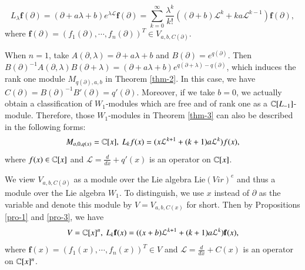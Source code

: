 \documentclass[12pt]{amsart}
\begin{document}
\begin{equation}\label{V(x)}
L_\lambda\mathbf{f}(\partial)
=(\partial+a\lambda+b)e^{\lambda\mathcal{L}}\mathbf{f}(\partial)
=\sum_{k=0}^\infty\frac{\lambda^k}{k!} ((\partial+b)\mathcal{L}^k+ka\mathcal{L}^{k-1})\mathbf{f}(\partial),
\end{equation}
where $\mathbf{f}(\partial)=
(f_1(\partial),\cdots,f_n(\partial))^T\in V_{a,b,C(\partial)}$.

\begin{rmk}When $n=1$, take $A(\partial,\lambda)=\partial+a\lambda+b$ and $B(\partial)=e^{q(\partial)}$. Then $B(\partial)^{-1}A(\partial,\lambda)B(\partial+\lambda)
=(\partial+a\lambda+b)e^{q(\partial+\lambda)-q(\partial)}$, which induces the rank one module $M_{q(\partial), a,b}$ in Theorem \ref{thm-2}. In this case, we have $C(\partial)=B(\partial)^{-1}B'(\partial)=q'(\partial)$.
Moreover, if we take $b=0$, we actually obtain a classification of $W_1$-modules which are
free and of rank one as a $\mathbb{C}[L_{-1}]$-module. Therefore, those $W_1$-modules in Theorem \ref{thm-3} can also be described in the following forms:
$$M_{a,0,q(x)}=\C[x],\ L_kf(x)=(x\mathcal{L}^{k+1}+(k+1) a\mathcal{L}^{k})f(x),$$
where $f(x)\in \mathbb{C}[x]$ and $\mathcal{L}=\frac{d}{dx}+q'(x)$ is an operator on $\mathbb{C}[x]$.
\end{rmk}

We view $V_{a, b, C(\partial)}$ as a module over the Lie algebra $\text{Lie}( Vir)^e$ and thus a module over the Lie algebra $W_1$.
To distinguish, we use $x$ instead of $\partial$ as the variable and denote this module by
$V=V_{a, b, C(x)}$ for short.
Then by Propositions \ref{pro-1} and \ref{pro-3}, we have
$$V=\C[x]^n,\ L_k\mathbf{f}(x)=((x+b)\mathcal{L}^{k+1}+(k+1) a\mathcal{L}^{k})\mathbf{f}(x),$$
where $\mathbf{f}(x)=
(f_1(x),\cdots,f_n(x))^T\in V$ and $\mathcal{L}=\frac{d}{dx}+C(x)$ is an operator on $\mathbb{C}[x]^n$.
\end{document}
